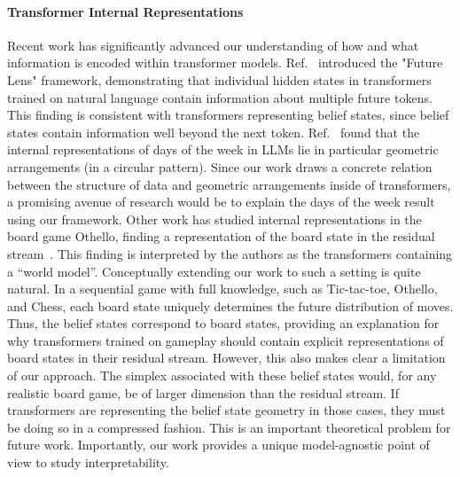 \documentclass{article}
\begin{document}
\paragraph{Transformer Internal Representations}
Recent work has significantly advanced our understanding of how and what information is encoded within transformer models. Ref.~\citep{Pal23_Future} introduced the "Future Lens" framework, demonstrating that individual hidden states in transformers trained on natural language contain information about multiple future tokens. This finding is consistent with transformers representing belief states, since belief states contain information well beyond the next token. Ref.~\citep{engels2024not} found that the internal representations of days of the week in LLMs lie in particular geometric arrangements (in a circular pattern). Since our work draws a concrete relation between the structure of data and geometric arrangements inside of transformers, a promising avenue of research would be to explain the days of the week result using our framework.
Other work has studied internal representations in the board game Othello, finding a representation of the board state in the residual stream~\cite{li2022emergent, nanda2023emergent}. This finding is interpreted by the authors as the transformers containing a “world model”. Conceptually extending our work to such a setting is quite natural. In a sequential game with full knowledge, such as Tic-tac-toe, Othello, and Chess, each board state uniquely determines the future distribution of moves. Thus, the belief states correspond to board states, providing an explanation for why transformers trained on gameplay should contain explicit representations of board states in their residual stream.
However, this also makes clear a limitation of our approach. The simplex associated with these belief states would, for any realistic board game, be of larger dimension than the residual stream. If transformers are representing the belief state geometry in those cases, they must be doing so in a compressed fashion. This is an important theoretical problem for future work. Importantly, our work provides a unique model-agnostic point of view to study interpretability.
\end{document}
